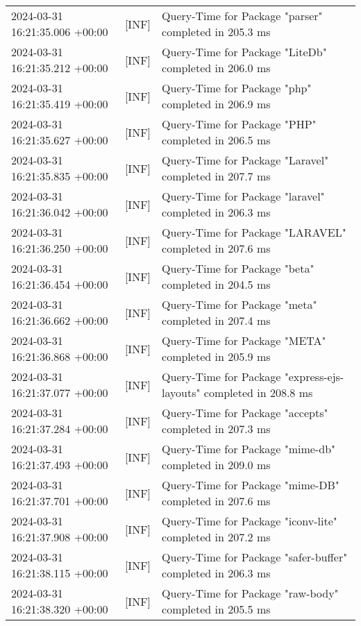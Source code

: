 {{\begin{tabularx}{\textwidth}{|l|l|X|}
                    2024-03-31 16:21:35.006 +00:00 & [INF] & Query-Time for Package "parser" completed in 205.3 ms \\
                    2024-03-31 16:21:35.212 +00:00 & [INF] & Query-Time for Package "LiteDb" completed in 206.0 ms \\
                    2024-03-31 16:21:35.419 +00:00 & [INF] & Query-Time for Package "php" completed in 206.9 ms \\
                    2024-03-31 16:21:35.627 +00:00 & [INF] & Query-Time for Package "PHP" completed in 206.5 ms \\
                    2024-03-31 16:21:35.835 +00:00 & [INF] & Query-Time for Package "Laravel" completed in 207.7 ms \\
                    2024-03-31 16:21:36.042 +00:00 & [INF] & Query-Time for Package "laravel" completed in 206.3 ms \\
                    2024-03-31 16:21:36.250 +00:00 & [INF] & Query-Time for Package "LARAVEL" completed in 207.6 ms \\
                    2024-03-31 16:21:36.454 +00:00 & [INF] & Query-Time for Package "beta" completed in 204.5 ms \\
                    2024-03-31 16:21:36.662 +00:00 & [INF] & Query-Time for Package "meta" completed in 207.4 ms \\
                    2024-03-31 16:21:36.868 +00:00 & [INF] & Query-Time for Package "META" completed in 205.9 ms \\
                    2024-03-31 16:21:37.077 +00:00 & [INF] & Query-Time for Package "express-ejs-layouts" completed in 208.8 ms \\
                    2024-03-31 16:21:37.284 +00:00 & [INF] & Query-Time for Package "accepts" completed in 207.3 ms \\
                    2024-03-31 16:21:37.493 +00:00 & [INF] & Query-Time for Package "mime-db" completed in 209.0 ms \\
                    2024-03-31 16:21:37.701 +00:00 & [INF] & Query-Time for Package "mime-DB" completed in 207.6 ms \\
                    2024-03-31 16:21:37.908 +00:00 & [INF] & Query-Time for Package "iconv-lite" completed in 207.2 ms \\
                    2024-03-31 16:21:38.115 +00:00 & [INF] & Query-Time for Package "safer-buffer" completed in 206.3 ms \\
                    2024-03-31 16:21:38.320 +00:00 & [INF] & Query-Time for Package "raw-body" completed in 205.5 ms \\

\end{tabularx}}}
